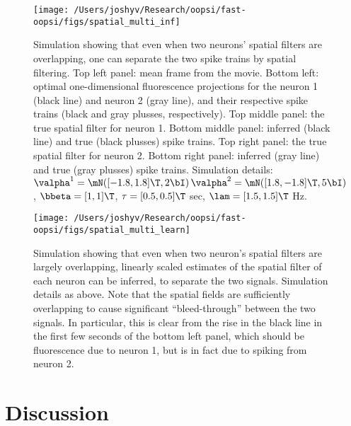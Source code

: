 \begin{figure}[h!]
\centering \texttt{[image: /Users/joshyv/Research/oopsi/fast-oopsi/figs/spatial\_multi\_inf]}
\caption[overlapping spatial filters are not problematic]{Simulation showing that even when two neurons' spatial filters are overlapping, one can separate the two spike trains by spatial filtering. Top left panel: mean frame from the movie.  Bottom left: optimal one-dimensional fluorescence projections for the neuron 1 (black line) and neuron 2 (gray line), and their respective spike trains (black and gray plusses, respectively).  Top middle panel: the true spatial filter for neuron 1.  Bottom middle panel: inferred (black line) and true (black plusses) spike trains.  Top right panel: the true spatial filter for neuron 2.  Bottom right panel: inferred (gray line) and true (gray plusses) spike trains. Simulation details: $\valpha^1=\mN([-1.8, 1.8]\T,2 \bI)\, \valpha^2=\mN([1.8, -1.8]\T,5 \bI)$, $\bbeta=[1, 1]\T$, $\tau=[0.5, 0.5]\T$ sec, $\lam=[1.5, 1.5]\T$ Hz.} \label{fig:spatial_multi_inf}
\end{figure}



\begin{figure}[h!]
\centering \texttt{[image: /Users/joshyv/Research/oopsi/fast-oopsi/figs/spatial\_multi\_learn]}
\caption[overlapping spatial filters can be estimated]{Simulation showing that even when two neuron's spatial filters are largely overlapping, linearly scaled estimates of the spatial filter of each neuron can be inferred, to separate the two signals. Simulation details as above. Note that the spatial fields are sufficiently overlapping to cause significant ``bleed-through'' between the two signals.  In particular, this is clear from the rise in the black line in the first few seconds of the bottom left panel, which should be fluorescence due to neuron 1, but is in fact due to spiking from neuron 2.} \label{fig:spatial_multi_learn}
\end{figure}





\section{Discussion} \label{sec:dis}


